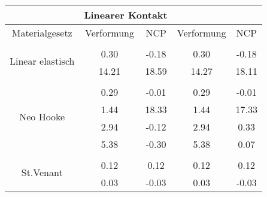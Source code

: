 \begin{table} 
\centering 
\begin{tabular}{c|cc|cc|} 
\cline{2-5} 
 & \multicolumn{2}{|c|}{Linearer Kontakt} &  \\ 
\hline 
\multicolumn{1}{|c|}{Materialgesetz} & \multicolumn{1}{c|}{Verformung} & \multicolumn{1}{c|}{NCP} & \multicolumn{1}{c|}{Verformung} & \multicolumn{1}{c|}{NCP} \\ 
\hline 
\multicolumn{1}{|c|}{\multirow{3}{*}{Linear elastisch}} &\multicolumn{1}{|c|}{} & \multicolumn{1}{|c|}{} & \multicolumn{1}{|c|}{} & \multicolumn{1}{|c|}{} \\ 
\multicolumn{1}{|c|}{} & \multicolumn{1}{|c|}{      0.30} & \multicolumn{1}{|c|}{     -0.18} & \multicolumn{1}{|c|}{      0.30} & \multicolumn{1}{|c|}{     -0.18} \\ 
\multicolumn{1}{|c|}{} & \multicolumn{1}{|c|}{     14.21} & \multicolumn{1}{|c|}{     18.59} & \multicolumn{1}{|c|}{     14.27} & \multicolumn{1}{|c|}{     18.11} \\ 
\hline 
\multicolumn{1}{|c|}{\multirow{5}{*}{Neo Hooke}} &\multicolumn{1}{|c|}{} & \multicolumn{1}{|c|}{} & \multicolumn{1}{|c|}{} & \multicolumn{1}{|c|}{} \\ 
\multicolumn{1}{|c|}{} & \multicolumn{1}{|c|}{      0.29} & \multicolumn{1}{|c|}{     -0.01} & \multicolumn{1}{|c|}{      0.29} & \multicolumn{1}{|c|}{     -0.01} \\ 
\multicolumn{1}{|c|}{} & \multicolumn{1}{|c|}{      1.44} & \multicolumn{1}{|c|}{     18.33} & \multicolumn{1}{|c|}{      1.44} & \multicolumn{1}{|c|}{     17.33} \\ 
\multicolumn{1}{|c|}{} & \multicolumn{1}{|c|}{      2.94} & \multicolumn{1}{|c|}{     -0.12} & \multicolumn{1}{|c|}{      2.94} & \multicolumn{1}{|c|}{      0.33} \\ 
\multicolumn{1}{|c|}{} & \multicolumn{1}{|c|}{      5.38} & \multicolumn{1}{|c|}{     -0.30} & \multicolumn{1}{|c|}{      5.38} & \multicolumn{1}{|c|}{      0.07} \\ 
\hline 
\multicolumn{1}{|c|}{\multirow{7}{*}{St.Venant}} &\multicolumn{1}{|c|}{} & \multicolumn{1}{|c|}{} & \multicolumn{1}{|c|}{} & \multicolumn{1}{|c|}{} \\ 
\multicolumn{1}{|c|}{} & \multicolumn{1}{|c|}{      0.12} & \multicolumn{1}{|c|}{      0.12} & \multicolumn{1}{|c|}{      0.12} & \multicolumn{1}{|c|}{      0.12} \\ 
\multicolumn{1}{|c|}{} & \multicolumn{1}{|c|}{      0.03} & \multicolumn{1}{|c|}{     -0.03} & \multicolumn{1}{|c|}{      0.03} & \multicolumn{1}{|c|}{     -0.03} \\ 

\end{tabular}
\end{table}
